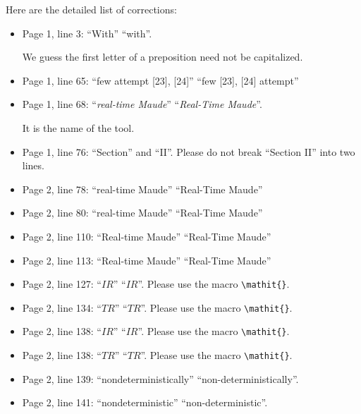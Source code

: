 \documentclass[12pt,onecolumn]{IEEEtranTIE}
\begin{document}
\medskip
Here are the detailed list of corrections:

\medskip
\begin{itemize}\setlength{\itemsep}{10pt}

\item Page 1, line 3: ``With'' \by ``with''.

We guess the first letter of a preposition need not be capitalized.

\item Page 1, line 65: ``few attempt [23], [24]'' \by ``few [23], [24] attempt''

\item Page 1, line 68: ``\emph{real-time Maude}'' \by ``\emph{Real-Time Maude}''.

It is the name of the tool.

\item Page 1, line 76: ``Section'' and ``II''. Please do not break
  ``Section II'' into two lines.

\item Page 2, line 78: ``real-time Maude'' \by ``Real-Time Maude''

\item Page 2, line 80: ``real-time Maude'' \by ``Real-Time Maude''
  
\item Page 2, line 110: ``Real-time Maude'' \by ``Real-Time Maude''

\item Page 2, line 113: ``Real-time Maude'' \by ``Real-Time Maude''

\item Page 2, line 127: ``$IR$'' \by ``$\mathit{IR}$''. Please use the
  macro \verb|\mathit{}|.

\item Page 2, line 134: ``$TR$'' \by ``$\mathit{TR}$''. Please use the
  macro \verb|\mathit{}|.

\item Page 2, line 138: ``$IR$'' \by ``$\mathit{IR}$''. Please use the
  macro \verb|\mathit{}|.  

\item Page 2, line 138: ``$TR$'' \by ``$\mathit{TR}$''. Please use the
  macro \verb|\mathit{}|.

\item Page 2, line 139: ``nondeterministically'' \by
  ``non-deterministically''.

\item Page 2, line 141: ``nondeterministic'' \by
  ``non-deterministic''.


\end{itemize}
\end{document}
